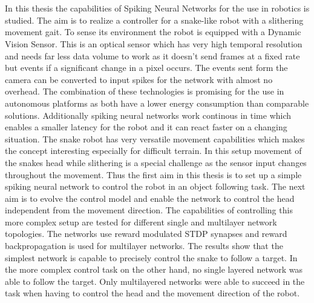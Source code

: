 \chapter{\abstractname}



In this thesis the capabilities of Spiking Neural Networks for the use in robotics is studied. The aim is to realize a controller for a snake-like robot with a slithering movement gait. To sense its environment the robot is equipped with a Dynamic Vision Sensor. This is an optical sensor which has very high temporal resolution and needs far less data volume to work as it doesn't send frames at a fixed rate but events if a significant change in a pixel occurs. The events sent form the camera can be converted to input spikes for the network with almost no overhead. The combination of these technologies is promising for the use in autonomous platforms as both have a lower energy consumption than comparable solutions. Additionally spiking neural networks work continous in time which enables a smaller latency for the robot and it can react faster on a changing situation. The snake robot has very versatile movement capabilities which makes the concept interesting especially for difficult terrain.
\newline
In this setup movement of the snakes head while slithering is a special challenge as the sensor input changes throughout the movement. Thus the first aim in this thesis is to set up a simple spiking neural network to control the robot in an object following task. The next aim is to evolve the control model and enable the network to control the head independent from the movement direction. The capabilities of controlling this more complex setup are tested for different single and multilayer network topologies. The networks use reward modulated STDP synapses and reward backpropagation is used for multilayer networks.
The results show that the simplest network is capable to precisely control the snake to follow a target. In the more complex control task on the other hand, no single layered network was able to follow the target.
Only multilayered networks were able to succeed in the task when having to control the head and the movement direction of the robot.






